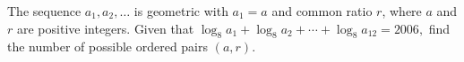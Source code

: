 The sequence $a_1, a_2, \ldots$ is geometric with $a_1=a$ and common ratio $r$, where $a$ and $r$ are positive integers.  Given that $\log_8 a_1+\log_8 a_2+\cdots+\log_8 a_{12} = 2006,$ find the number of possible ordered pairs $(a,r)$.